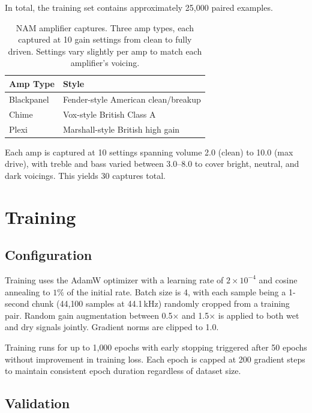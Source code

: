 \documentclass[11pt,twocolumn]{article}
\begin{document}
In total, the training set contains approximately 25{,}000 paired examples.

\begin{table}[t]
\centering
\caption{NAM amplifier captures. Three amp types, each captured at 10 gain settings from clean to fully driven. Settings vary slightly per amp to match each amplifier's voicing.}
\label{tab:nam}
\small
\begin{tabular}{@{}ll@{}}
\toprule
Amp Type & Style \\
\midrule
Blackpanel & Fender-style American clean/breakup \\
Chime      & Vox-style British Class A \\
Plexi      & Marshall-style British high gain \\
\bottomrule
\end{tabular}
\vspace{0.5em}

Each amp is captured at 10 settings spanning volume 2.0 (clean) to 10.0 (max drive), with treble and bass varied between 3.0--8.0 to cover bright, neutral, and dark voicings. This yields 30 captures total.
\end{table}

\section{Training}

\subsection{Configuration}

Training uses the AdamW optimizer with a learning rate of $2 \times 10^{-4}$ and cosine annealing to $1\%$ of the initial rate. Batch size is 4, with each sample being a 1-second chunk (44{,}100 samples at 44.1\,kHz) randomly cropped from a training pair. Random gain augmentation between 0.5$\times$ and 1.5$\times$ is applied to both wet and dry signals jointly. Gradient norms are clipped to 1.0.

Training runs for up to 1{,}000 epochs with early stopping triggered after 50 epochs without improvement in training loss. Each epoch is capped at 200 gradient steps to maintain consistent epoch duration regardless of dataset size.

\subsection{Validation}
\end{document}
